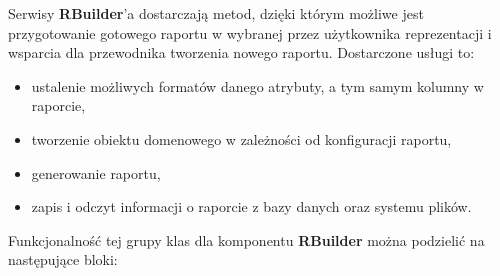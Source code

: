 	Serwisy \textbf{RBuilder}'a dostarczają metod, dzięki którym możliwe jest przygotowanie gotowego raportu
	w wybranej przez użytkownika reprezentacji i wsparcia dla przewodnika tworzenia nowego raportu. Dostarczone usługi to:
	\begin{itemize}
		\item ustalenie możliwych formatów danego atrybuty, a tym samym kolumny w raporcie,
		\item tworzenie obiektu domenowego w zależności od konfiguracji raportu,
		\item generowanie raportu,
		\item zapis i odczyt informacji o raporcie z bazy danych oraz systemu plików.
	\end{itemize}
	Funkcjonalność tej grupy klas dla komponentu \textbf{RBuilder} można podzielić na następujące bloki:
